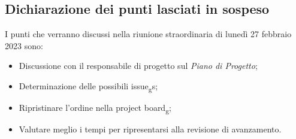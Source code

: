 \subsection{Dichiarazione dei punti lasciati in sospeso}
 I punti che verranno discussi nella riunione straordinaria di lunedì 27 febbraio 2023 sono:
 \begin{itemize}
    \item Discussione con il responsabile di progetto sul \textit{Piano di Progetto};
    \item Determinazione delle possibili issue\textsubscript{g}s;
    \item Ripristinare l'ordine nella project board\textsubscript{g};
    \item Valutare meglio i tempi per ripresentarsi alla revisione di avanzamento.
 \end{itemize}
